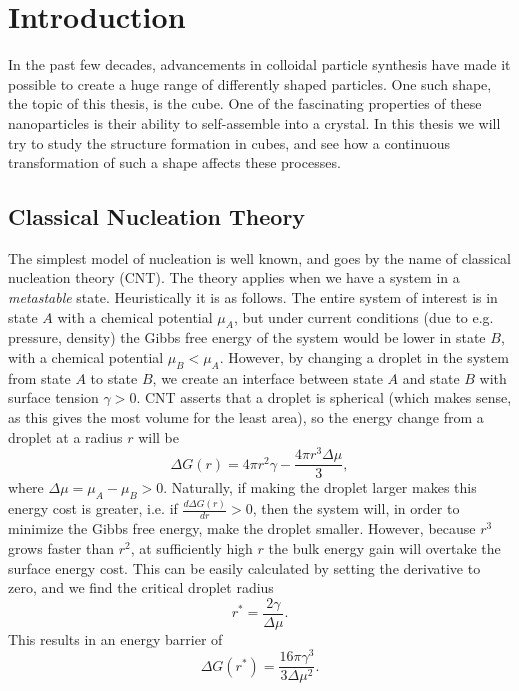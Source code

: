 \documentclass[thesis]{subfiles}
\begin{document}
\section{Introduction}

In the past few decades, advancements in colloidal particle synthesis have made it possible to create a huge range of differently shaped particles. One such shape, the topic of this thesis, is the cube. One of the fascinating properties of these nanoparticles is their ability to self-assemble into a crystal. In this thesis we will try to study the structure formation in cubes, and see how a continuous transformation of such a shape affects these processes. 

\subsection{Classical Nucleation Theory}\label{subsec:cnt}

The simplest model of nucleation is well known, and goes by the name of classical nucleation theory (CNT). The theory applies when we have a system in a \emph{metastable} state. Heuristically it is as follows. The entire system of interest is in state $A$ with a chemical potential $\mu_A$, but under current conditions (due to e.g. pressure, density) the Gibbs free energy of the system would be lower in state $B$, with a chemical potential $\mu_B < \mu_A$. However, by changing a droplet in the system from state $A$ to state $B$, we create an interface between state $A$ and state $B$ with surface tension $\gamma > 0$. CNT asserts that a droplet is spherical (which makes sense, as this gives the most volume for the least area), so the energy change from a droplet at a radius $r$ will be	
\begin{equation}
\Delta G(r) = 4\pi r^2 \gamma - \frac{4\pi r^3 \Delta\mu}{3},
\end{equation}
where $\Delta\mu = \mu_A - \mu_B > 0$. Naturally, if making the droplet larger makes this energy cost is greater, i.e. if $\frac{d\Delta G(r)}{dr} > 0$, %
then the system will, in order to minimize the Gibbs free energy, make the droplet smaller. However, because $r^3$ grows faster than $r^2$, at sufficiently high $r$ the bulk energy gain will overtake the surface energy cost. This can be easily calculated by setting the derivative to zero, and we find the critical droplet radius
\begin{equation}
r^* = \frac{2\gamma}{\Delta\mu}.
\end{equation}
This results in an energy barrier of 
\begin{equation}
\Delta G (r^*) = \frac{16 \pi \gamma^3}{3 \Delta\mu^2}.
\end{equation}
\end{document}
